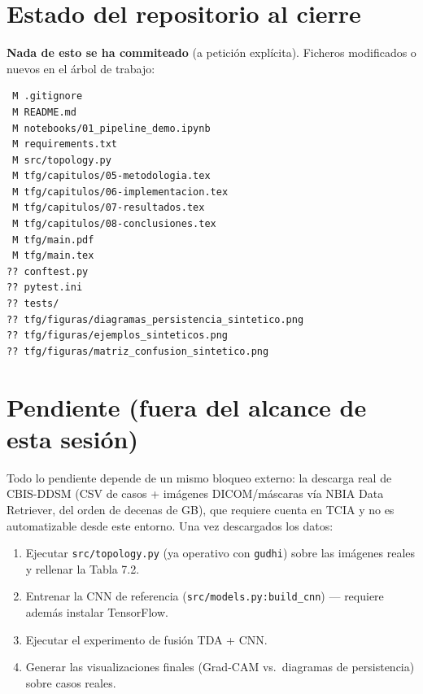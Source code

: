 \documentclass[11pt,a4paper]{article}
\begin{document}
\section*{Estado del repositorio al cierre}
\textbf{Nada de esto se ha commiteado} (a petición explícita). Ficheros
modificados o nuevos en el árbol de trabajo:
\begin{lstlisting}
 M .gitignore
 M README.md
 M notebooks/01_pipeline_demo.ipynb
 M requirements.txt
 M src/topology.py
 M tfg/capitulos/05-metodologia.tex
 M tfg/capitulos/06-implementacion.tex
 M tfg/capitulos/07-resultados.tex
 M tfg/capitulos/08-conclusiones.tex
 M tfg/main.pdf
 M tfg/main.tex
?? conftest.py
?? pytest.ini
?? tests/
?? tfg/figuras/diagramas_persistencia_sintetico.png
?? tfg/figuras/ejemplos_sinteticos.png
?? tfg/figuras/matriz_confusion_sintetico.png
\end{lstlisting}

\section*{Pendiente (fuera del alcance de esta sesión)}
Todo lo pendiente depende de un mismo bloqueo externo: la descarga real de
CBIS-DDSM (CSV de casos + imágenes DICOM/máscaras vía NBIA Data Retriever,
del orden de decenas de GB), que requiere cuenta en TCIA y no es automatizable
desde este entorno. Una vez descargados los datos:
\begin{enumerate}[nosep]
  \item Ejecutar \texttt{src/topology.py} (ya operativo con \texttt{gudhi})
        sobre las imágenes reales y rellenar la Tabla 7.2.
  \item Entrenar la CNN de referencia (\texttt{src/models.py:build\_cnn}) ---
        requiere además instalar TensorFlow.
  \item Ejecutar el experimento de fusión TDA + CNN.
  \item Generar las visualizaciones finales (Grad-CAM vs.\ diagramas de
        persistencia) sobre casos reales.
\end{enumerate}
\end{document}

